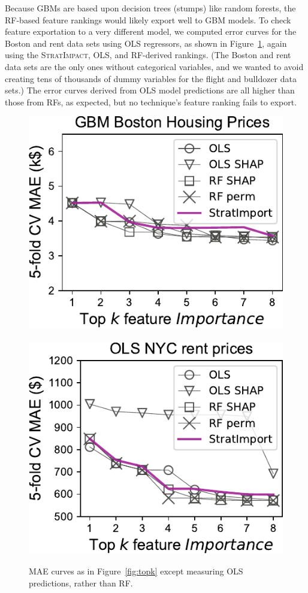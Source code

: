 \documentclass[11pt]{article}
\newcommand{\figref}[1]{Figure~\ref{#1}}
\newcommand{\simp}{\fontfamily{cmr}\textsc{\small StratImpact}}
\begin{document}
Because GBMs are based upon decision trees (stumps) like random forests, the RF-based feature rankings would likely export well to GBM models.  To check feature exportation to a very different model, we computed error curves for the Boston and rent  data sets using OLS regressors, as shown in \figref{fig:OLS}, again using the \simp{}, OLS, and RF-derived rankings. (The Boston and rent data sets are the only ones without categorical variables, and we wanted to avoid creating tens of thousands of dummy variables for the flight and bulldozer data sets.) The error curves derived from OLS model predictions are all higher than those from RFs, as expected, but no technique's feature ranking fails to export.

\begin{figure}[htbp]
\begin{center}
\includegraphics[scale=0.5]{images/boston-topk-OLS-Importance.pdf}~~~
\includegraphics[scale=0.5]{images/rent-topk-OLS-Importance.pdf}
\caption[short]{\small MAE curves as in \figref{fig:topk} except measuring OLS predictions, rather than RF.}
\label{fig:OLS}
\end{center}
\end{figure}
\end{document}
